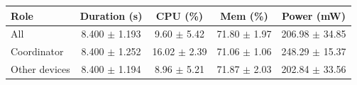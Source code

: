 \begin{tabular}{lcccc}
\hline
\textbf{Role} & \textbf{Duration (s)} & \textbf{CPU (\%)} & \textbf{Mem (\%)} & \textbf{Power (mW)} \\
\hline
All & 8.400 $\pm$ 1.193 & 9.60 $\pm$ 5.42 & 71.80 $\pm$ 1.97 & 206.98 $\pm$ 34.85 \\
Coordinator & 8.400 $\pm$ 1.252 & 16.02 $\pm$ 2.39 & 71.06 $\pm$ 1.06 & 248.29 $\pm$ 15.37 \\
Other devices & 8.400 $\pm$ 1.194 & 8.96 $\pm$ 5.21 & 71.87 $\pm$ 2.03 & 202.84 $\pm$ 33.56 \\
\hline
\end{tabular}
